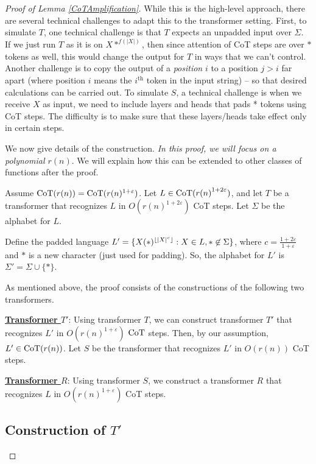 \documentclass{article}
\let\epsilon\varepsilon
\theoremstyle{definition}
\DeclarePairedDelimiter{\floor}{\lfloor}{\rfloor}
\newcommand{\x}{\mathbf{x}}
\newcommand{\0}{\mathbf{0}}
\newcommand{\CoT}{\mbox{\rm CoT}}
\newcommand{\1}{\mathbbm{1}}
\begin{document}
\begin{proof}[Proof of Lemma \ref{CoTAmplification}]
While this is the high-level approach, there are several technical challenges to adapt this to the transformer setting. First, to simulate $T$, one technical challenge is that $T$ expects an unpadded input over $\Sigma$. If we just run $T$ as it is on $X *^{f(|X|)}$, then since attention of CoT steps are over $*$ tokens as well, this would change the output for $T$ in ways that we can't control. Another challenge is to copy the output of a \textit{position} $i$ to a position $j > i$ far apart (where position $i$ means the $i^{\text{th}}$ token in the input string) -- so that desired calculations can be carried out. %
To simulate $S$, a technical challenge is when we receive $X$ as input, we need to include layers and heads that pads * tokens using CoT steps. The difficulty is to make sure that these layers/heads take effect only in certain steps.   

We now give details of the construction. 
\textit{In this proof, we will focus on a polynomial $r(n)$}. We will explain how this can be extended to other classes of functions after the proof. 

Assume $\CoT(r(n)) = \CoT(r(n)^{1 + \epsilon})$. 
Let  $L \in \CoT({r(n)}^{1 + 2\epsilon})$, and let $T$ be a transformer that recognizes $L$ in $O(r(n)^{1 + 2\epsilon})$ CoT steps. Let $\Sigma$ be the alphabet for $L$.

Define the padded language  
$L' = \{X (*)^{\floor{|X|^c}} : X \in L, * \not\in \Sigma\}$, where $c = \frac{1 + 2\epsilon}{1 + \epsilon}$ and $*$ is a new character (just used for padding). So, the alphabet for $L'$ is $\Sigma' = \Sigma \cup \{*\}$. 

As mentioned above, the proof consists of the constructions of the following two transformers. 

\noindent\textbf{\underline{Transformer $T'$}}: Using transformer $T$, we can construct transformer $T'$ that recognizes $L'$ in $O(r(n)^{1 + \epsilon})$ $\CoT$ steps. Then, by our assumption, $L' \in \CoT(r(n))$. Let $S$ be the transformer that recognizes $L'$ in $O(r(n))$ CoT steps. 

\noindent\textbf{\underline{Transformer $R$}}: Using transformer $S$, we construct a transformer $R$ that recognizes $L$ in $O(r(n)^{1 + \epsilon})$ CoT steps.

\subsection{Construction of \texorpdfstring{$T'$}{T'}}
    

\end{proof}
\end{document}

